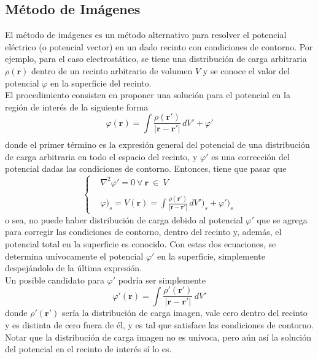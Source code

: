 \subsection{Método de Imágenes}
El método de imágenes es un método alternativo para resolver el potencial eléctrico (o potencial vector) en un dado recinto con condiciones de contorno. Por ejemplo, para el caso electrostático, se tiene una distribución de carga arbitraria $\rho(\textbf{r})$ dentro de un recinto arbitrario de volumen $V$ y se conoce el valor del potencial $\varphi$ en la superficie del recinto.\\
\indent El procedimiento consisten en proponer una solución para el potencial en la región de interés de la siguiente forma
\begin{equation*}
    \varphi(\textbf{r}) = 
    \int\limits_{}\frac{\rho(\textbf{r}')}{|\textbf{r}-\textbf{r}'|}\,dV' + \varphi'
\end{equation*}
donde el primer término es la expresión general del potencial de una distribución de carga arbitraria en todo el espacio del recinto, y $\varphi'$ es una corrección del potencial dadas las condiciones de contorno. Entonces, tiene que pasar que
\begin{equation*}
    \left\{
        \begin{matrix}
            &\nabla^{2}\varphi' = 0\ \forall\ \textbf{r}\ \in\ V\\
            &\\
            &\varphi\Big)_{s} = V(\textbf{r}) 
            = \int\frac{\rho(\textbf{r}')}{|\textbf{r}-\textbf{r}'|}\,dV'\Big)_{s} + \varphi'\Big)_{s}
        \end{matrix}
    \right.
\end{equation*}
o sea, no puede haber distribución de carga debido al potencial $\varphi'$ que se agrega para corregir las condiciones de contorno, dentro del recinto y, además, el potencial total en la superficie es conocido. Con estas dos ecuaciones, se determina unívocamente el potencial $\varphi'$ en la superficie, simplemente despejándolo de la última expresión.\\
\indent Un posible candidato para $\varphi'$ podría ser simplemente
\begin{equation*}
    \varphi'(\textbf{r}) = \int\frac{\rho'(\textbf{r}')}{|\textbf{r} -\textbf{r}'|}\,dV'
\end{equation*}
donde $\rho'(\textbf{r}')$ sería la distribución de carga imagen, vale cero dentro del recinto y es distinta de cero fuera de él, y es tal que satisface las condiciones de contorno. Notar que la distribución de carga imagen no es unívoca, pero aún así la solución del potencial en el recinto de interés sí lo es. 
